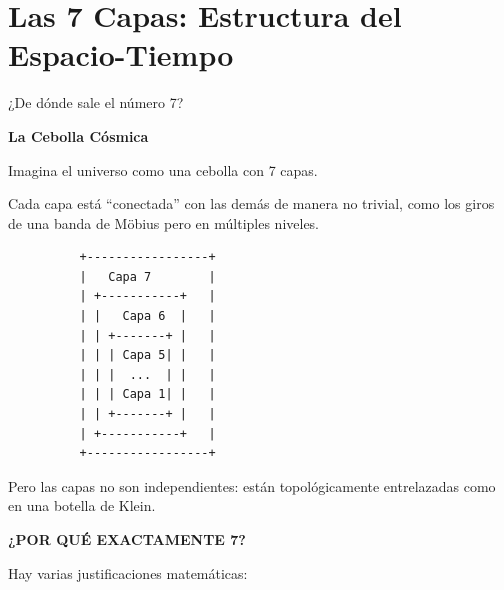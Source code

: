 \section{Las 7 Capas: Estructura del Espacio-Tiempo}

¿De dónde sale el número 7?

\begin{analogiabox}
\textbf{La Cebolla Cósmica}

Imagina el universo como una cebolla con 7 capas.

Cada capa está ``conectada'' con las demás de manera no trivial,
como los giros de una banda de Möbius pero en múltiples niveles.

\begin{center}
\begin{verbatim}
          +-----------------+
          |   Capa 7        |
          | +-----------+   |
          | |   Capa 6  |   |
          | | +-------+ |   |
          | | | Capa 5| |   |
          | | |  ...  | |   |
          | | | Capa 1| |   |
          | | +-------+ |   |
          | +-----------+   |
          +-----------------+
\end{verbatim}
\end{center}

Pero las capas no son independientes: están topológicamente
entrelazadas como en una botella de Klein.
\end{analogiabox}

\textbf{¿POR QUÉ EXACTAMENTE 7?}

Hay varias justificaciones matemáticas:

